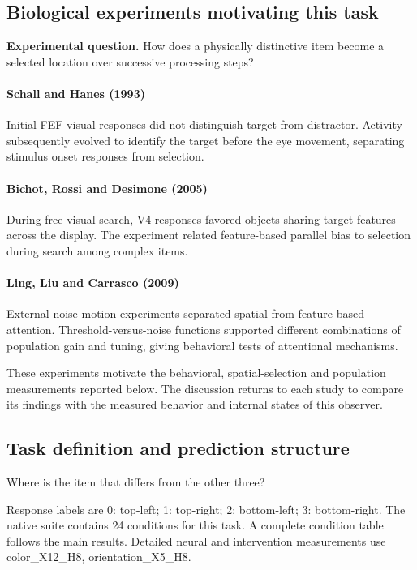 \documentclass[11pt]{article}
\begin{document}
\subsection{Biological experiments motivating this task}
\textbf{Experimental question.} How does a physically distinctive item become a selected location over successive processing steps?

\paragraph{Schall and Hanes (1993)} Initial FEF visual responses did not distinguish target from distractor. Activity subsequently evolved to identify the target before the eye movement, separating stimulus onset responses from selection. \cite{bio_schall}

\paragraph{Bichot, Rossi and Desimone (2005)} During free visual search, V4 responses favored objects sharing target features across the display. The experiment related feature-based parallel bias to selection during search among complex items. \cite{bio_bichot}

\paragraph{Ling, Liu and Carrasco (2009)} External-noise motion experiments separated spatial from feature-based attention. Threshold-versus-noise functions supported different combinations of population gain and tuning, giving behavioral tests of attentional mechanisms. \cite{bio_ling}

These experiments motivate the behavioral, spatial-selection and population measurements reported below. The discussion returns to each study to compare its findings with the measured behavior and internal states of this observer.
\subsection{Task definition and prediction structure}
Where is the item that differs from the other three?

Response labels are 0: top-left; 1: top-right; 2: bottom-left; 3: bottom-right. The native suite contains 24 conditions for this task. A complete condition table follows the main results. Detailed neural and intervention measurements use color\_\allowbreak{}X12\_\allowbreak{}H8, orientation\_\allowbreak{}X5\_\allowbreak{}H8.
\end{document}
